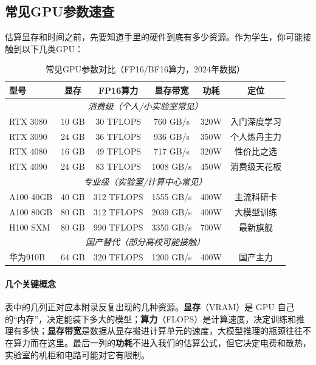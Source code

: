 \subsection*{常见GPU参数速查}

估算显存和时间之前，先要知道手里的硬件到底有多少资源。作为学生，你可能接触到以下几类GPU：

\begin{table}[htbp]
\centering
\small
\renewcommand{\arraystretch}{1.3}
\begin{tabular}{l|c|c|c|c|c}
\toprule
\textbf{型号} & \textbf{显存} & \textbf{FP16算力} & \textbf{显存带宽} & \textbf{功耗} & \textbf{定位} \\
\midrule
\multicolumn{6}{c}{\textit{消费级（个人/小实验室常见）}} \\
\midrule
RTX 3080 & 10 GB & 30 TFLOPS & 760 GB/s & 320W & 入门深度学习 \\
RTX 3090 & 24 GB & 36 TFLOPS & 936 GB/s & 350W & 个人炼丹主力 \\
RTX 4080 & 16 GB & 49 TFLOPS & 717 GB/s & 320W & 性价比之选 \\
RTX 4090 & 24 GB & 83 TFLOPS & 1008 GB/s & 450W & 消费级天花板 \\
\midrule
\multicolumn{6}{c}{\textit{专业级（实验室/计算中心常见）}} \\
\midrule
A100 40GB & 40 GB & 312 TFLOPS & 1555 GB/s & 400W & 主流科研卡 \\
A100 80GB & 80 GB & 312 TFLOPS & 2039 GB/s & 400W & 大模型训练 \\
H100 SXM & 80 GB & 990 TFLOPS & 3350 GB/s & 700W & 最新旗舰 \\
\midrule
\multicolumn{6}{c}{\textit{国产替代（部分高校可能接触）}} \\
\midrule
华为910B & 64 GB & 320 TFLOPS & 1200 GB/s & 400W & 国产主力 \\
\bottomrule
\end{tabular}
\caption{常见GPU参数对比（FP16/BF16算力，2024年数据）}
\end{table}


\paragraph{几个关键概念}

表中的几列正对应本附录反复出现的几种资源。\textbf{显存}（VRAM）是 GPU 自己的“内存”，决定能装下多大的模型；\textbf{算力}（FLOPS）是计算速度，决定训练和推理有多快；\textbf{显存带宽}是数据从显存搬进计算单元的速度，大模型推理的瓶颈往往不在算力而在这里。最后一列的\textbf{功耗}不进入我们的估算公式，但它决定电费和散热，实验室的机柜和电路可能对它有限制。

